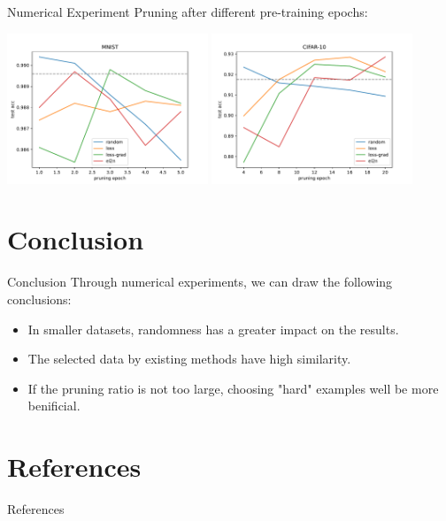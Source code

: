 \documentclass{ctexbeamer}
\begin{document}
\begin{frame}{Numerical Experiment}
    Pruning after different pre-training epochs:
    \begin{center}
        \includegraphics[width=0.45\textwidth]{../images/mnist_pruning.pdf}
        \includegraphics[width=0.45\textwidth]{../images/cifar10_pruning.pdf}
    \end{center}
\end{frame}

\section{Conclusion}
\begin{frame}{Conclusion}
    Through numerical experiments, we can draw the following conclusions:
    \begin{itemize}
        \item In smaller datasets, randomness has a greater impact on the results.
        \item The selected data by existing methods have high similarity.
        \item If the pruning ratio is not too large, choosing "hard" examples well be more benificial.
    \end{itemize}
\end{frame}

\section{References}
\begin{frame}{References}
    \printbibliography
\end{frame}
\end{document}
